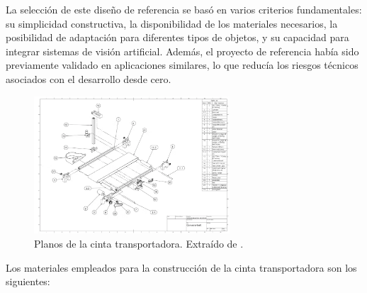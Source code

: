 \documentclass[11pt,spanish,listoffigures,listoftables]{tfgetsinf}
\begin{document}
La selección de este diseño de referencia se basó en varios criterios fundamentales: su simplicidad constructiva, la disponibilidad de los materiales necesarios, la posibilidad de adaptación para diferentes tipos de objetos, y su capacidad para integrar sistemas de visión artificial. Además, el proyecto de referencia había sido previamente validado en aplicaciones similares, lo que reducía los riesgos técnicos asociados con el desarrollo desde cero.

\begin{figure}[H]
   \centering
   \includegraphics[width=0.65\textwidth]{images/prueba_de_concepto/planos_cinta.png}
   \caption[Planos de la cinta transportadora]{Planos de la cinta transportadora. Extraído de \cite{hackster_counting_inspection}.}
   \label{fig:planos_cinta}
\end{figure}

Los materiales empleados para la construcción de la cinta transportadora son los siguientes:
\end{document}
